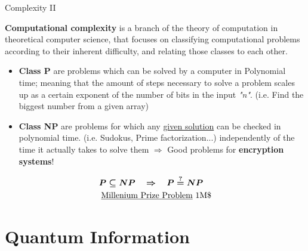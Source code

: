 \documentclass[9pt, handout, aspectratio=169]{beamer}		%
\begin{document}
	\begin{frame}{Complexity II}

		\textbf{Computational complexity} is a branch of the theory of computation in theoretical computer science, that focuses on classifying computational problems according to their inherent difficulty, and relating those classes to each other. \pause

		\begin{itemize}
			\item \textbf{Class P} are problems which can be solved by a computer in Polynomial time; meaning that the amount of steps necessary to solve a problem scales up as a certain exponent of the number of bits in the input \emph{"n"}. (i.e. Find the biggest number from a given array) \pause
			\item \textbf{Class NP} are problems for which any \underline{given solution} can be checked in polynomial time. (i.e. Sudokus, Prime factorization...) independently of the time it actually takes to solve them $\Rightarrow$ Good problems for \textbf{encryption systems}!
		\end{itemize}

		\pause

		\vspace{-8pt}
		\begin{align*}
			\boldsymbol{P \subseteq NP \quad \Rightarrow \quad P \overset{?}{=} NP \quad } \\
			\text{\underline{Millenium Prize Problem} 1M\$}
		\end{align*}
		\vspace{-20pt}

	\end{frame}


\section{Quantum Information}
\end{document}
